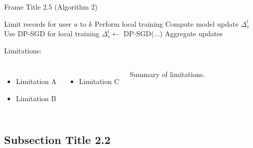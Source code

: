\documentclass{beamer}
\begin{document}
\begin{frame}{Frame Title 2.5 (Algorithm 2)} %
    \begin{algorithm}[H]
        \caption{Placeholder Algorithm 2}
        \begin{algorithmic}[1]\scriptsize
            \State \colorbox{lightorange}{Limit records for user $u$ to $k$} 
            \EndFor
                \State Perform local training
                \State Compute model update $\Delta_s^t$
                \State \colorbox{lightorange}{Use DP-SGD for local training} 
                \State $\Delta_s^t \leftarrow$ DP-SGD(...)
            \EndFor
            \State Aggregate updates
        \end{algorithmic}
    \end{algorithm}
    \vspace{-1em}
    \begin{alertblock}{Limitations:}
        \begin{columns}
            \begin{itemize}\scriptsize
                \item Limitation A
                \item Limitation B
            \end{itemize}

            \vspace{-2em}
            \begin{itemize}\scriptsize
                \item Limitation C
            \end{itemize}
            Summary of limitations.
        \end{columns}
        \end{alertblock}
\end{frame}

\subsection{Subsection Title 2.2} %
\end{document}
